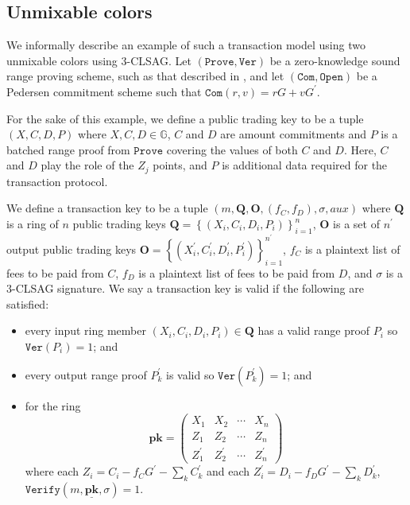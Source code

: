 \documentclass[draft]{llncs} %
\begin{document}
\subsection{Unmixable colors}\label{sec:unmixable}
We informally describe an example of such a transaction model using two unmixable colors using $3$-CLSAG. Let $(\texttt{Prove}, \texttt{Ver})$ be a zero-knowledge sound range proving scheme, such as that described in \cite{bulletproofs}, and let $(\texttt{Com}, \texttt{Open})$ be a Pedersen commitment scheme such that $\texttt{Com}(r,v) = rG + v G^\prime$.

For the sake of this example, we define a public trading key to be a tuple $(X, C, D, P)$ where $X, C, D \in \mathbb{G}$, $C$ and $D$ are amount commitments and $P$ is a batched range proof from $\texttt{Prove}$ covering the values of both $C$ and $D$. Here, $C$ and $D$ play the role of the $Z_j$ points, and $P$ is additional data required for the transaction protocol.

We define a transaction key to be a tuple $(m, \textbf{Q}, \textbf{O}, (f_C, f_D), \sigma, \textit{aux})$ where $\textbf{Q}$ is a ring of $n$ public trading keys  $\textbf{Q} = \left\{(X_i, C_i, D_i, P_i)\right\}_{i=1}^{n}$, $\textbf{O}$ is a set of $n^\prime$ output public trading keys $\textbf{O} = \left\{(X_i^\prime, C_i^\prime, D_i^\prime, P_i^\prime)\right\}_{i=1}^{n^\prime}$, $f_C$ is a plaintext list of fees to be paid from $C$, $f_D$ is a plaintext list of fees to be paid from $D$, and $\sigma$ is a $3$-CLSAG signature. We say a transaction key is valid if the following are satisfied:
\begin{itemize}
\item every input ring member $(X_i, C_i, D_i, P_i) \in \textbf{Q}$ has a valid range proof $P_i$ so $\texttt{Ver}(P_i) = 1$; and

\item every output range proof $P_k^\prime$ is valid so $\texttt{Ver}(P_k^\prime)=1$; and

\item for the ring \[\textbf{pk} = \begin{pmatrix} X_1 & X_2 & \cdots & X_n \\ Z_1 & Z_2 & \cdots & Z_n \\ Z_1^\prime & Z_2^\prime & \cdots & Z_n^\prime\end{pmatrix}\] where each $Z_i = C_i - f_C G^\prime - \sum_k C_k^\prime$ and each $Z_i^\prime = D_i - f_D G^\prime - \sum_k D_k^\prime$,  $\texttt{Verify}(m, \underline{\textbf{pk}}, \sigma) = 1$.
\end{itemize}
\end{document}

